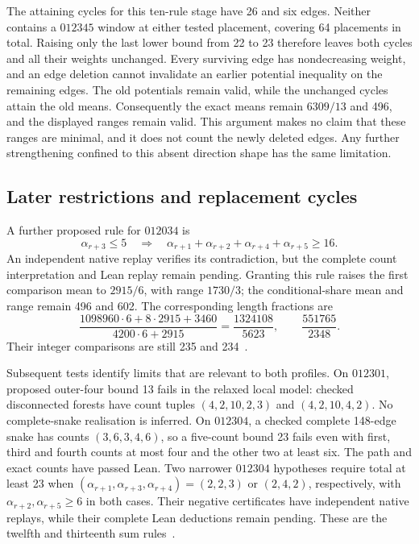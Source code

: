 \documentclass[11pt,a4paper]{article}
\theoremstyle{definition}
\theoremstyle{remark}
\begin{document}
The attaining cycles for this ten-rule stage have 26 and six edges. Neither contains a
$012345$ window at either tested placement, covering 64 placements in
total. Raising only the last lower bound from 22 to 23 therefore leaves
both cycles and all their weights unchanged. Every surviving edge has
nondecreasing weight, and an edge deletion cannot invalidate an earlier
potential inequality on the remaining edges. The old potentials remain
valid, while the unchanged cycles attain the old means. Consequently the
exact means remain $6309/13$ and 496, and the displayed ranges remain
valid. This argument makes no claim that these ranges are minimal, and
it does not count the newly deleted edges. Any further strengthening
confined to this absent direction shape has the same limitation.

\subsection{Later restrictions and replacement cycles}
A further proposed rule for $012034$ is
\[
\alpha_{r+3}\le5\quad\Longrightarrow\quad
\alpha_{r+1}+\alpha_{r+2}+\alpha_{r+4}+\alpha_{r+5}\ge16.
\]
An independent native replay verifies its contradiction, but the complete
count interpretation and Lean replay remain pending. Granting this rule
raises the first comparison mean to $2915/6$, with range $1730/3$; the
conditional-share mean and range remain 496 and 602. The corresponding
length fractions are
\[
\frac{1098960\cdot6+8\cdot2915+3460}{4200\cdot6+2915}
=\frac{1324108}{5623},\qquad \frac{551765}{2348}.
\]
Their integer comparisons are still 235 and 234~\cite{latersumarchive}.

Subsequent tests identify limits that are relevant to both profiles.
On $012301$, proposed outer-four bound 13 fails in the relaxed local model:
checked disconnected forests have count tuples $(4,2,10,2,3)$ and
$(4,2,10,4,2)$. No complete-snake realisation is inferred. On $012304$, a
checked complete 148-edge snake has counts $(3,6,3,4,6)$, so a five-count
bound 23 fails even with first, third and fourth counts at most four and
the other two at least six. The path and exact counts have passed Lean.
Two narrower $012304$ hypotheses require total at least 23 when
$(\alpha_{r+1},\alpha_{r+3},\alpha_{r+4})=(2,2,3)$ or $(2,4,2)$,
respectively, with $\alpha_{r+2},\alpha_{r+5}\ge6$ in both cases.
Their negative certificates have independent native replays, while their
complete Lean deductions remain pending. These are the twelfth and
thirteenth sum rules~\cite{latersumarchive}.
\end{document}
